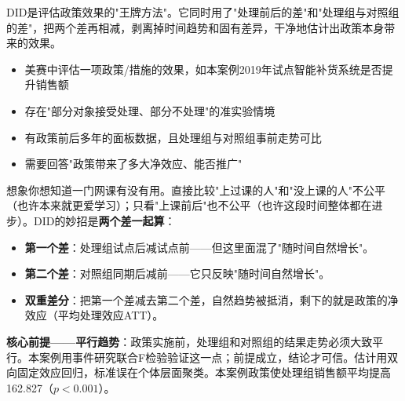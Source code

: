 
\begin{algointro}
DID是评估政策效果的"王牌方法"。它同时用了"处理前后的差"和"处理组与对照组的差"，把两个差再相减，剥离掉时间趋势和固有差异，干净地估计出政策本身带来的效果。
\end{algointro}

\begin{algoscene}
\begin{itemize}
    \item 美赛中评估一项政策/措施的效果，如本案例2019年试点智能补货系统是否提升销售额
    \item 存在"部分对象接受处理、部分不处理"的准实验情境
    \item 有政策前后多年的面板数据，且处理组与对照组事前走势可比
    \item 需要回答"政策带来了多大净效应、能否推广"
\end{itemize}
\end{algoscene}

\begin{algoprinciple}
想象你想知道一门网课有没有用。直接比较"上过课的人"和"没上课的人"不公平（也许本来就更爱学习）；只看"上课前后"也不公平（也许这段时间整体都在进步）。DID的妙招是\textbf{两个差一起算}：

\begin{itemize}
    \item \textbf{第一个差}：处理组试点后减试点前——但这里面混了"随时间自然增长"。
    \item \textbf{第二个差}：对照组同期后减前——它只反映"随时间自然增长"。
    \item \textbf{双重差分}：把第一个差减去第二个差，自然趋势被抵消，剩下的就是政策的净效应（平均处理效应ATT）。
\end{itemize}

\textbf{核心前提——平行趋势}：政策实施前，处理组和对照组的结果走势必须大致平行。本案例用事件研究联合F检验验证这一点；前提成立，结论才可信。估计用双向固定效应回归，标准误在个体层面聚类。本案例政策使处理组销售额平均提高162.827（$p<0.001$）。
\end{algoprinciple}

